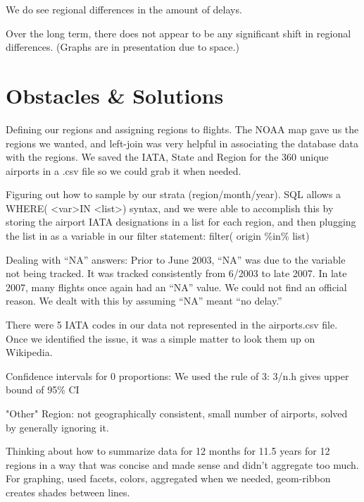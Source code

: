 \documentclass{article}
\begin{document}
We do see regional differences in the amount of delays. 

Over the long term, there does not appear to be any significant shift in regional differences. (Graphs are in presentation due to space.)

\section{Obstacles \& Solutions}
Defining our regions and assigning regions to flights. The NOAA map gave us the regions we wanted, and left-join was very helpful in associating the database data with the regions. We saved the IATA, State and Region for the 360 unique airports in a .csv file so we could grab it when needed.

Figuring out how to sample by our strata (region/month/year). SQL allows a WHERE( \textless var\textgreater  IN \textless list\textgreater) syntax, and we were able to accomplish this by storing the airport IATA designations in a list for each region, and then plugging the list in as a variable in our filter statement: filter( origin \%in\% list)

Dealing with ``NA'' answers: Prior to June 2003, ``NA'' was due to the variable not being tracked. It was tracked consistently from 6/2003 to late 2007. In late 2007, many flights once again had an ``NA'' value. We could not find an official reason. We dealt with this by assuming ``NA'' meant ``no delay.''

There were 5 IATA codes in our data not represented in the airports.csv file. Once we identified the issue, it was a simple matter to look them up on Wikipedia. 

Confidence intervals for 0 proportions: We used the rule of 3: 3/n.h gives upper bound of 95\% CI

"Other" Region: not geographically consistent, small number of airports, solved by generally ignoring it.

Thinking about how to summarize data for 12 months for 11.5 years for 12 regions in a way that was concise and made sense and didn't aggregate too much. For graphing, used facets, colors, aggregated when we needed, geom-ribbon creates shades between lines.
\end{document}
